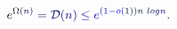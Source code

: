 \documentclass[12pt]{article}
\begin{document}
\makeatletter
\renewcommand*{\@textcolor}[3]{%
  \protect\leavevmode
  \begingroup
    \color#1{#2}#3%
  \endgroup
}
\makeatother
\begin{displaymath}
\mathcolor[RGB]{0,0,15}{e} ^ { \mathcolor[RGB]{0,0,30}{\Omega} \mathcolor[RGB]{0,0,45}{(} \mathcolor[RGB]{0,0,60}{n} \mathcolor[RGB]{0,0,75}{)} } \mathcolor[RGB]{0,0,90}{=} \mathcal { \mathcolor[RGB]{0,0,105}{D} } \mathcolor[RGB]{0,0,120}{(} \mathcolor[RGB]{0,0,135}{n} \mathcolor[RGB]{0,0,150}{)} \mathcolor[RGB]{0,0,165}{\leq} \mathcolor[RGB]{0,0,180}{e} ^ { \mathcolor[RGB]{0,0,195}{(} \mathcolor[RGB]{0,0,210}{1} \mathcolor[RGB]{0,0,225}{-} \mathcolor[RGB]{0,0,240}{o} \mathcolor[RGB]{0,0,255}{(} \mathcolor[RGB]{0,15,0}{1} \mathcolor[RGB]{0,15,15}{)} \mathcolor[RGB]{0,15,30}{)} \mathcolor[RGB]{0,15,45}{n} \mathcolor[RGB]{0,15,60}{\operatorname*} { \mathcolor[RGB]{0,15,75}{l} \mathcolor[RGB]{0,15,90}{o} \mathcolor[RGB]{0,15,105}{g} } \mathcolor[RGB]{0,15,120}{n} } \mathcolor[RGB]{0,15,135}{.}
\end{displaymath}
\end{document}
